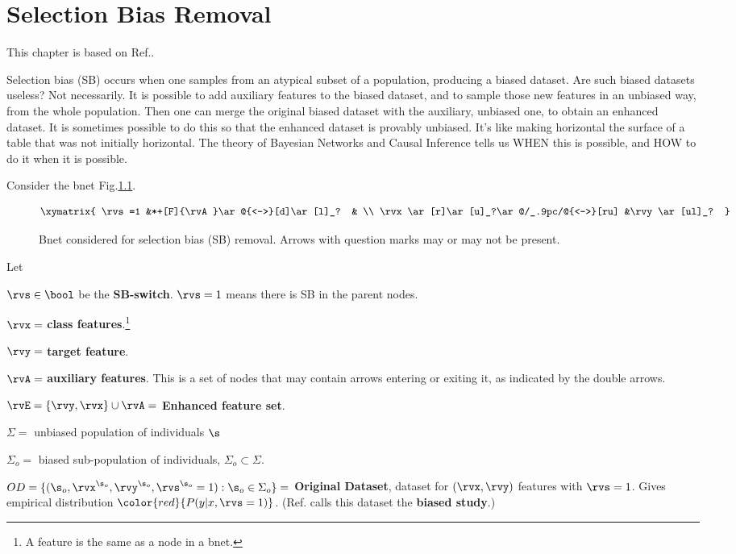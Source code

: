 \chapter{Selection Bias Removal}
\label{ch-sb-removal}
This chapter
is based on Ref.\cite{bare-sb-removal}.

Selection bias (SB)
occurs when one
samples from an
atypical subset
of a
population,
producing a biased dataset.
Are such biased
datasets
useless? Not necessarily.
It is possible to
add auxiliary features
to the biased dataset, and to
sample those new features
in an unbiased way,
 from the whole population.
Then
one can merge
the original
 biased dataset with the
auxiliary, unbiased one,
to obtain an enhanced dataset.
It is sometimes
possible to do this so that the enhanced
dataset is provably
unbiased.
It's like making horizontal
the surface of a table
 that was
 not initially
horizontal.
The theory of Bayesian Networks and Causal
Inference tells us
WHEN this is possible,
and HOW to do it
when it is possible.

Consider the bnet
Fig.\ref{fig-bs-removal-basic}.

\begin{figure}[h!]
$$
\xymatrix{
\rvs=1
&*+[F]{\rvA}\ar@{<->}[d]\ar[l]_?
&
\\
\rvx\ar[r]\ar[u]_?\ar@/_.9pc/@{<->}[ru]
&\rvy\ar[ul]_?
}
$$
\caption{Bnet considered for
selection bias (SB) removal.
Arrows with question marks
may or may not be present.}
\label{fig-bs-removal-basic}
\end{figure}

Let

$\rvs\in\bool$
be the {\bf SB-switch}.
$\rvs=1$ means there is
SB
in the parent nodes.


$\rvx=$ {\bf class features}.\footnote{
A feature is the same as a node in a bnet.}

$\rvy=$ {\bf target feature}.

$\rvA=$ {\bf auxiliary features}.
This is a set of nodes that
may contain arrows entering
or exiting it, as indicated by the double arrows.

$\rvE=\{\rvy, \rvx\}\cup\rvA=$
{\bf Enhanced feature set}.


$\Sigma=$ unbiased population of individuals $\s$

$\Sigma_o=$ biased sub-population of individuals,
$\Sigma_o\subset \Sigma$.

$OD=\{({\s_o},\rvx^{\s_o},  \rvy^{\s_o},\rvs^{\s_o}=1):{\s_o}\in\Sigma_o\}=$
{\bf Original Dataset}, dataset for $(\rvx,\rvy)$ features
with $\rvs=1$.
Gives empirical
distribution $\color{red}{P(y|x, \rvs=1)}$.
(Ref.\cite{bare-sb-removal}
calls this dataset the {\bf biased study}.)

